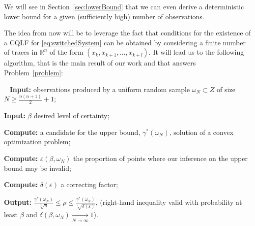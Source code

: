 \begin{rem}
We will see in Section~\ref{sec:lowerBound} that we can even derive a deterministic lower bound for a given (sufficiently high) number of observations. 
\end{rem}
The idea from now will be to leverage the fact that conditions for the existence of a CQLF for \eqref{eq:switchedSystem} can be obtained by considering a finite number of traces in $\mathbb{R}^n$ of the form $(x_k,x_{k+1}, \dots, x_{k+l})$. It will lead us to the following algorithm, that is the main result of our work and that answers Problem~\ref{problem}:
\begin{alg}
 \ 
\newline
\textbf{Input:} observations produced by a uniform random sample $\omega_N \subset Z$ of size $N \geq \frac{n(n+1)}{2}+1$;

\vspace{-0.2cm}
\textbf{Input:} $\beta$ desired level of certainty;

\vspace{-0.2cm}
\textbf{Compute:} a candidate for the upper bound, $\gamma^{*}(\omega_N)$, solution of a convex optimization problem;

\vspace{-0.2cm}
\textbf{Compute:} $\varepsilon(\beta,\omega_N)$ the proportion of points where our inference on the upper bound may be invalid;

\vspace{-0.2cm}
\textbf{Compute:} $\delta(\varepsilon)$ a correcting factor;

\vspace{-0.2cm}
\textbf{Output:} $\frac{\gamma^{*}(\omega_N)}{\sqrt[2l]{n}} \leq \rho \leq \frac{\gamma^{*}(\omega_N)}{\sqrt[l]{\delta(\varepsilon)}}$, (right-hand inequality valid with probability at least $\beta$ and $\delta(\beta, \omega_N)   \xrightarrow[N \to \infty]{} 1$).
\end{alg}